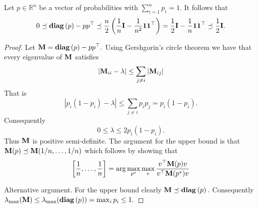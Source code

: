\documentclass[11pt]{article}
\newcommand{\R}{\mathbb{R}} %
\newcommand{\diag}[1]{\mathbf{diag}\left( #1\right)}
\newcommand{\mI}{{\bf I}}
\newcommand{\mM}{{\bf M}}
\newcommand{\ones}{{\bf 1}}
\begin{document}
\begin{lemma}\label{lem:probmat}
Let $p \in \R^n$ be a vector of probabilities with $\sum_{i=1}^n p_i =1.$ It follows that
\begin{equation}
 0  \preceq   \diag{p} - p p^\top \preceq  \frac{n}{2} \left( \frac{1}{n}\mI - \frac{1}{n^2}\ones \ones^\top  \right) = \frac{1}{2}\mI - \frac{1}{n}\ones \ones^\top \preceq  \frac{1}{2}\mI .
\end{equation}
\end{lemma}
\begin{proof}
Let $\mM =\diag{p} - p p^\top.$
Using Gershgorin's circle theorem we have that every eigenvalue of $\mM$ satisfies
\[ |\mM_{ii} - \lambda  | \leq \sum_{j\neq i} |\mM_{ij}| \]
That is
\[ |p_i(1-p_i) - \lambda  | \leq \sum_{j\neq i} p_i p_j = p_i(1-p_i). \]
Consequently
\[0 \leq \lambda \leq 2 p_i(1-p_i).\]
Thus $\mM$ is positive semi-definite. The argument for the upper bound is that $\mM(p) \preceq \mM(1/n , \ldots , 1/n)$ which follows by showing that 
\[ \left[ \frac{1}{n}, \ldots, \frac{1}{n}\right]= \arg\max_{p^*} \max_v \frac{v ^\top \mM(p) v}{v ^\top \mM(p^*) v}\]


Alternative argument. For the upper bound clearly $\mM \preceq \diag{p}.$ Consequently $\lambda_{\max}(\mM) \leq \lambda_{\max}(\diag{p}) = \max_i p_i \leq 1.$
\end{proof}
\end{document}
